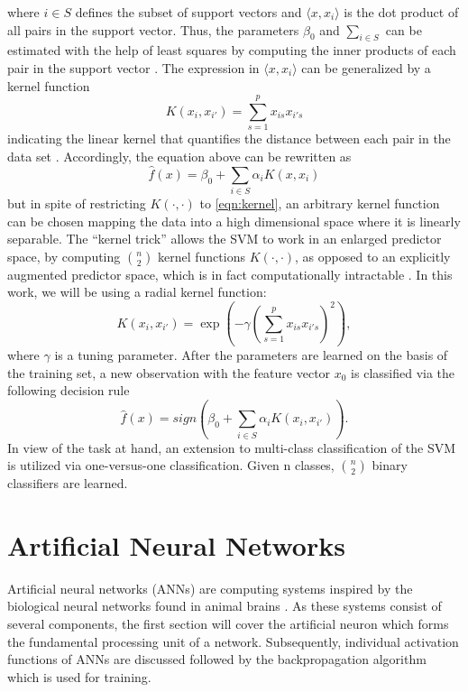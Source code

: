 where $i \in S$ defines the subset of support vectors and $\langle x, x_i \rangle$ is the dot product of all pairs in the support vector. Thus, the parameters $\beta_0$ and $\sum_{i \in S}$ can be estimated with the help of least squares by computing the inner products of each pair in the support vector \cite{efron_hastie_2016}. The expression in $\langle x, x_i \rangle$ can be generalized by a kernel function
\begin{equation} \label{eqn:kernel}
  K(x_i,x_{i'}) = \sum_{s=1}^{p} x_{is} x_{i's}
\end{equation}
indicating the linear kernel that quantifies the distance between each pair in the data set \cite{James:2014:ISL:2517747}. Accordingly, the equation above can be rewritten as
\begin{equation}
  \hat f(x) = \beta_0 + \sum_{i \in S} \alpha_i K(x, x_i)
\end{equation}
but in spite of restricting $K(\cdot, \cdot)$ to \ref{eqn:kernel}, an arbitrary kernel function can be chosen mapping the data into a high dimensional space where it is linearly separable. The ``kernel trick'' allows the SVM to work in an enlarged predictor space, by computing $\binom{n}{2}$ kernel functions $K(\cdot, \cdot)$, as opposed to an explicitly augmented predictor space, which is in fact computationally intractable \cite{James:2014:ISL:2517747}. In this work, we will be using a radial kernel function:
\begin{equation}
  K(x_i,x_{i'}) = \exp(-\gamma(\sum_{s=1}^{p}x_{is}x_{i's})^2),
\end{equation}
where $\gamma$ is a tuning parameter. After the parameters are learned on the basis of the training set, a new observation with the feature vector $x_0$ is classified via the following decision rule
\begin{equation}
  \hat f(x) = sign(\beta_0 + \sum_{i \in S} \alpha_i K(x_i, x_{i'})).
\end{equation}
In view of the task at hand, an extension to multi-class classification of the SVM is utilized via one-versus-one classification. Given n classes, $\binom{n}{2}$ binary classifiers are learned.

\section{Artificial Neural Networks}
Artificial neural networks (ANNs) are computing systems inspired by the biological neural networks found in animal brains \cite{Haykin:1998:NNC:521706}. As these systems consist of several components, the first section will cover the artificial neuron which forms the fundamental processing unit of a network. Subsequently, individual activation functions of ANNs are discussed followed by the backpropagation algorithm which is used for training.

